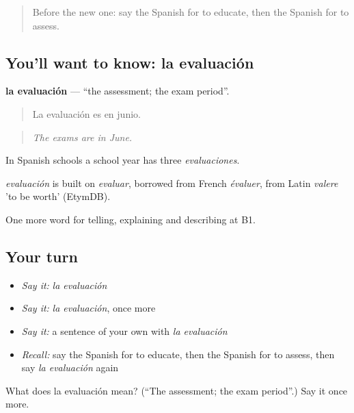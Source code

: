 \label{lesson:ES-C597-evaluacion}



\begin{quote}
Before the new one: say the Spanish for to educate, then the Spanish for to assess.
\end{quote}

\subsection*{You'll want to know: la evaluación}
\textbf{la evaluación} — \textquotedblleft{}the assessment; the exam period\textquotedblright{}.

\begin{quote}
La evaluación es en junio.
\end{quote}

\begin{quote}
\emph{The exams are in June.}
\end{quote}

In Spanish schools a school year has three \emph{evaluaciones}.

\begin{cousinweb}
\emph{evaluación} is built on \emph{evaluar}, borrowed from French \emph{évaluer}, from Latin \emph{valere} 'to be worth' (EtymDB).
\end{cousinweb}

\begin{grammarlens}[title={What you've built}]
One more word for telling, explaining and describing at B1.
\end{grammarlens}

\subsection*{Your turn}
\begin{itemize}
\raggedright
  \item \emph{Say it:} \emph{la evaluación}
  \item \emph{Say it:} \emph{la evaluación}, once more
  \item \emph{Say it:} a sentence of your own with \emph{la evaluación}
  \item \emph{Recall:} say the Spanish for to educate, then the Spanish for to assess, then say \emph{la evaluación} again
\end{itemize}

\begin{tcolorbox}[breakable,colback=teal!4,colframe=teal!35!black,title={Before you move on}]
What does la evaluación mean? (\textquotedblleft{}The assessment; the exam period\textquotedblright{}.) Say it once more.
\end{tcolorbox}
